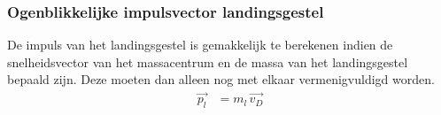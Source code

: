 \subsubsection{Ogenblikkelijke impulsvector landingsgestel}
De impuls van het landingsgestel is gemakkelijk te berekenen indien de snelheidsvector van het massacentrum en de massa van het landingsgestel bepaald zijn. Deze moeten dan alleen nog met elkaar vermenigvuldigd worden.
\begin{equation}
\begin{split}
\overrightarrow{{p}_{l}}
&=m_{l}\,\overrightarrow{{v}_{D}}\\
\end{split}
\end{equation}

